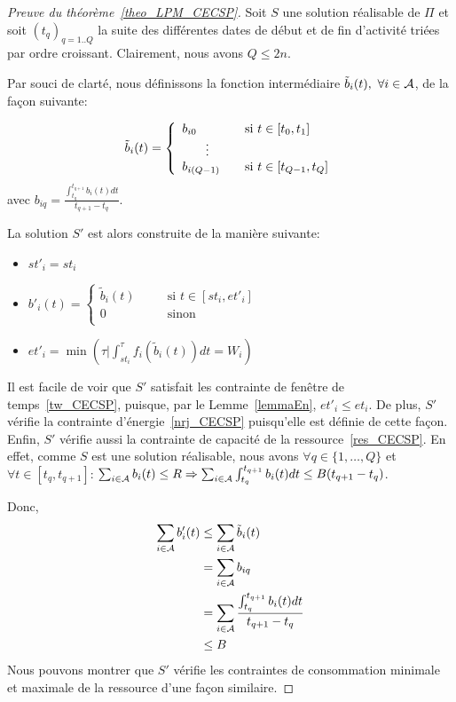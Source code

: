 \begin{proof}[Preuve du théorème~\ref{theo_LPM_CECSP}]  
  Soit $S$ une solution réalisable de $\Pi$ et soit
  $(t_q)_{q=1..Q}$ la suite des différentes dates de
  début et de fin d'activité triées par ordre croissant. Clairement,
  nous avons $Q\le 2n$. 

  Par souci de clarté, nous définissons la fonction intermédiaire
  $\tilde{b}_i(t),\ \forall i \in {\cal A}$, de la façon suivante:  

    \[\tilde{b}_i(t) =\left\{
        \begin{array}{lll}
          b_{i0} & & \text{si $t \in [t_0,t_1]$}\\
          \multicolumn{2}{c}{\vdots} &   \\
          b_{i(Q-1)} & & \text{si $t \in [t_{Q-1},t_Q]$}
        \end{array}
      \right.\]
    avec $b_{iq}=\frac{\int_{t_q}^{t_{q+1}} b_i(t) dt}{t_{q+1}-t_q}$.

    La solution $S'$ est alors construite de la manière suivante: 
    \begin{itemize}
    \item $st'_i=st_i$ 
    \item $b'_i(t)= \left\{ 
        \begin{array}{lll}
          \tilde{b}_i(t) &\quad& \text{si $t \in [st_i,et'_i]$}\\
          0 &\quad& \text{sinon}\\
        \end{array}
      \right.$
  \item $et'_i=\min(\tau | \int_{st_i}^{\tau} f_i(\tilde{b}_i(t))dt=W_i)$
  \end{itemize}

  Il est facile de voir que $S'$ satisfait les contrainte de fenêtre de
  temps~\eqref{tw_CECSP}, puisque, par le Lemme~\ref{lemmaEn},
  $et'_i\le et_i$. De plus, $S'$ vérifie la contrainte 
  d'énergie~\eqref{nrj_CECSP} puisqu'elle est définie de cette
  façon. Enfin, $S'$ vérifie aussi la contrainte de capacité de la
  ressource~\eqref{res_CECSP}. En effet, comme $S$ est une solution
  réalisable, nous avons $\forall q \in \{1,\dots,Q\}$ et $\forall t
  \in [t_q,t_{q+1}]$:  
  $\sum_{i\in {\cal A}}b_i(t) \le R \Rightarrow  
  \sum_{i\in {\cal A}} \int_{t_q}^{t_{q+1}} b_i(t)dt \le B(t_{q+1}-t_q)$.
 
  Donc, 
  \begin{align*}
    \sum_{i\in {\cal A}}b'_i(t) &\le 
                            \sum_{i\in {\cal A}} \tilde{b}_i(t)\\
                          &= 
                            \sum_{i\in {\cal A}} b_{iq}\\
                          &=
                            \sum_{i\in {\cal A}} \frac{\int_{t_q}^{t_{q+1}} b_i(t)dt}{t_{q+1}-t_q} \\
                          &\le B
  \end{align*}
  Nous pouvons montrer que $S'$ vérifie les contraintes de
  consommation minimale et maximale de la ressource d'une façon
  similaire. 
\end{proof}

